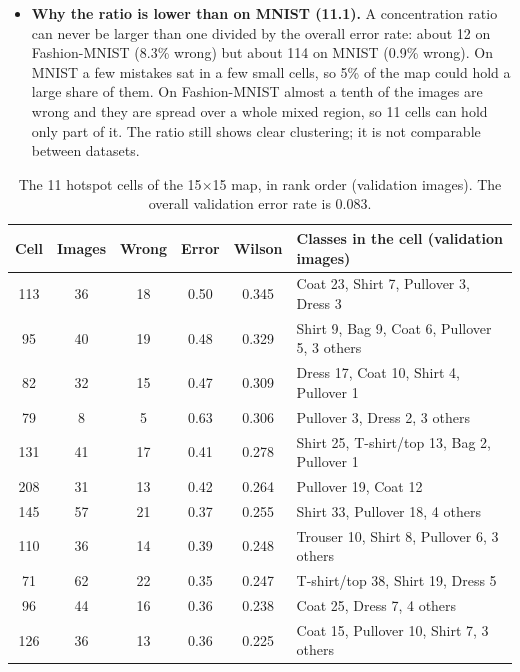 \documentclass[11pt]{article}
\begin{document}
\begin{itemize}[leftmargin=1.4em, itemsep=2pt]
\item \textbf{Why the ratio is lower than on MNIST (11.1).} A concentration ratio can never be larger than one divided by the overall error rate: about 12 on Fashion-MNIST (8.3\% wrong) but about 114 on MNIST (0.9\% wrong). On MNIST a few mistakes sat in a few small cells, so 5\% of the map could hold a large share of them. On Fashion-MNIST almost a tenth of the images are wrong and they are spread over a whole mixed region, so 11 cells can hold only part of it. The ratio still shows clear clustering; it is not comparable between datasets.
\end{itemize}

\begin{table}[H]
\centering
\renewcommand{\arraystretch}{1.08}
\small
\begin{tabular}{|c|c|c|c|c|l|}
\hline
\textbf{Cell} & \textbf{Images} & \textbf{Wrong} & \textbf{Error} & \textbf{Wilson} & \textbf{Classes in the cell (validation images)} \\ \hline
113 & 36 & 18 & 0.50 & 0.345 & Coat 23, Shirt 7, Pullover 3, Dress 3 \\ \hline
95 & 40 & 19 & 0.48 & 0.329 & Shirt 9, Bag 9, Coat 6, Pullover 5, 3 others \\ \hline
82 & 32 & 15 & 0.47 & 0.309 & Dress 17, Coat 10, Shirt 4, Pullover 1 \\ \hline
79 & 8 & 5 & 0.63 & 0.306 & Pullover 3, Dress 2, 3 others \\ \hline
131 & 41 & 17 & 0.41 & 0.278 & Shirt 25, T-shirt/top 13, Bag 2, Pullover 1 \\ \hline
208 & 31 & 13 & 0.42 & 0.264 & Pullover 19, Coat 12 \\ \hline
145 & 57 & 21 & 0.37 & 0.255 & Shirt 33, Pullover 18, 4 others \\ \hline
110 & 36 & 14 & 0.39 & 0.248 & Trouser 10, Shirt 8, Pullover 6, 3 others \\ \hline
71 & 62 & 22 & 0.35 & 0.247 & T-shirt/top 38, Shirt 19, Dress 5 \\ \hline
96 & 44 & 16 & 0.36 & 0.238 & Coat 25, Dress 7, 4 others \\ \hline
126 & 36 & 13 & 0.36 & 0.225 & Coat 15, Pullover 10, Shirt 7, 3 others \\ \hline
\end{tabular}
\caption{The 11 hotspot cells of the 15$\times$15 map, in rank order (validation images). The overall validation error rate is 0.083.}
\label{tab:hotspots}
\end{table}
\end{document}
